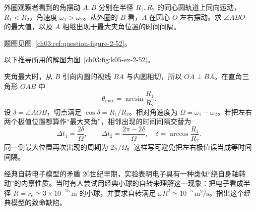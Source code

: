 {\begin{origexamplebox}{外圈观察者看到的角摆动}\label{ch03:ex:k05-2-52}
$A,B$ 分别在半径 $R_1,R_2$ 的同心圆轨道上同向运动，$R_1<R_2$，角速度 $\omega_1>\omega_2$。从外圈的 $B$ 看，$A$ 在圆心 $O$ 左右摆动。求 $\angle ABO$ 的最大值，以及 $A$ 相继出现于最大夹角位置的时间间隔。
\par 题图见图~\ref{ch03:ref:question-figure-2-52}。
\KQuestionCA
\end{origexamplebox}
\begin{xesolution}
以下推导所用的解图为图~\ref{ch03:fig:k05-ex-2-52}。

夹角最大时，从 $B$ 引向内圆的视线 $BA$ 与内圆相切，所以 $OA\perp BA$。在直角三角形 $OAB$ 中
\ConcentricSightDiagram
\[
 \boxed{\theta_{\max}=\arcsin\frac{R_1}{R_2}}.
\]
设 $\delta=\angle AOB$，切点满足 $\cos\delta=R_1/R_2$。相对角速度为 $\Omega=\omega_1-\omega_2$。若把左右两个极值位置都算作“最大夹角”，相邻出现的时间间隔交替为
\[
 \boxed{\Delta t_1=\frac{2\delta}{\Omega},\qquad
 \Delta t_2=\frac{2\pi-2\delta}{\Omega}},
 \quad \delta=\arccos\frac{R_1}{R_2}.
\]
同一侧最大位置再次出现的周期为 $\boxed{2\pi/\Omega}$。这样写可避免把左右极值误当成等时间间隔。
\end{xesolution}

\begin{origexamplebox}{经典自转电子模型的矛盾}\label{ch03:ex:k05-2-53}
20世纪早期，实验表明电子具有一种类似“绕自身轴转动”的内禀性质。当时有人尝试用经典小球的自转来理解这一现象：把电子看成半径 $R=r_e\simeq3\times10^{-15}\,\mathrm m$ 的小球，并要求自转满足 $\omega R^2\simeq10^{-5}\,\mathrm{m^2/s}$。指出这个经典模型的致命缺陷。


\end{origexamplebox}}
